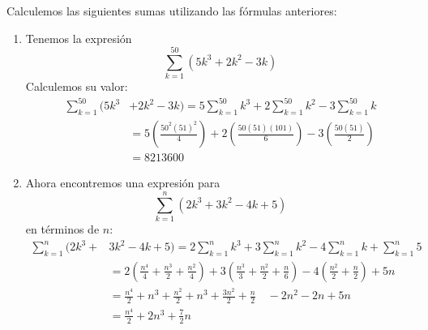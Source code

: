 \begin{ejemplo}
\textnormal {Calculemos las siguientes sumas utilizando las fórmulas anteriores}:
\end{ejemplo}
\begin{enumerate}[leftmargin=1.2em,   itemindent=0pt,       labelwidth=\labelwidth,labelsep=0.5em,]

\item Tenemos la expresión
\[
\sum_{k=1}^{50}\left( 5k^{3}+2k^{2}-3k\right)
\]
Calculemos su valor:
\begin{align*}
\sum_{k=1}^{50}(5k^{3}&+2k^{2}-3k)=5\sum_{k=1}^{50}k^{3}+2\sum_{k=1}^{50}k^{2}-3\sum_{k=1}^{50}k\\
&=5\left( \frac{50^{2}\left( 51\right) ^{2}}{4}\right) +2\left( \frac{
50\left( 51\right) \left( 101\right) }{6}\right) -3\left( \frac{50\left(
51\right) }{2}\right) \\
&=8213 600
\end{align*}

\item Ahora encontremos una expresión para
\[
\sum_{k=1}^{n}\left(2k^{3}+3k^{2}-4k+5\right)
\]
en términos de $n$:
{\footnotesize
\begin{align*}
\sum_{k=1}^{n}( 2k^{3}+&3k^{2}-4k+5)
=2\sum_{k=1}^{n}k^{3}+3\sum_{k=1}^{n}k^{2}-4\sum_{k=1}^{n}k+\sum_{k=1}^{n}5\\
&=2\left( \frac{n^{4}}{4}+\frac{n^{3}}{2}+\frac{n^{2}}{4}\right) +3\left(
\frac{n^{3}}{3}+\frac{n^{2}}{2}+\frac{n}{6}\right)%
-4\left( \frac{n^{2}}{2}+\frac{n}{2}\right) +5n\\
&=\frac{n^{4}}{2}+n^{3}+\frac{n^{2}}{2}+n^{3}+\frac{3n^{2}}{2}+\frac{n}{2}\quad -2n^{2}-2n+5n\\
&=\frac{n^{4}}{2}+2n^{3}+\frac{7}{2}n
\end{align*}
}
\end{enumerate}

